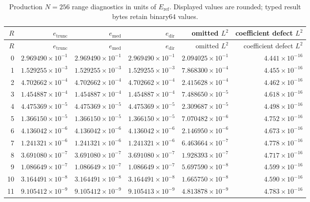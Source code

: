 \documentclass[11pt]{article}
\begin{document}
\begingroup
\small
\setlength{\tabcolsep}{4pt}
\begin{longtable}{r@{\quad}rrrrr}
\caption{Production $N=256$ range diagnostics in units of $E_{\mathrm{ref}}$.  Displayed values are rounded; typed result bytes retain binary64 values.}\\
\toprule
$R$ & $e_{\mathrm{trunc}}$ & $e_{\mathrm{med}}$ & $e_{\mathrm{dir}}$ & omitted $L^2$ & coefficient defect $L^2$ \\
\midrule
\endfirsthead
\toprule
$R$ & $e_{\mathrm{trunc}}$ & $e_{\mathrm{med}}$ & $e_{\mathrm{dir}}$ & omitted $L^2$ & coefficient defect $L^2$ \\
\midrule
\endhead
0  & $2.969490\times10^{-1}$ & $2.969490\times10^{-1}$ & $2.969490\times10^{-1}$ & $2.094025\times10^{-1}$ & $4.441\times10^{-16}$ \\
1  & $1.529255\times10^{-3}$ & $1.529255\times10^{-3}$ & $1.529255\times10^{-3}$ & $7.868300\times10^{-4}$ & $4.455\times10^{-16}$ \\
2  & $4.702662\times10^{-4}$ & $4.702662\times10^{-4}$ & $4.702662\times10^{-4}$ & $2.415628\times10^{-4}$ & $4.462\times10^{-16}$ \\
3  & $1.454887\times10^{-4}$ & $1.454887\times10^{-4}$ & $1.454887\times10^{-4}$ & $7.488650\times10^{-5}$ & $4.618\times10^{-16}$ \\
4  & $4.475369\times10^{-5}$ & $4.475369\times10^{-5}$ & $4.475369\times10^{-5}$ & $2.309687\times10^{-5}$ & $4.498\times10^{-16}$ \\
5  & $1.366150\times10^{-5}$ & $1.366150\times10^{-5}$ & $1.366150\times10^{-5}$ & $7.070482\times10^{-6}$ & $4.752\times10^{-16}$ \\
6  & $4.136042\times10^{-6}$ & $4.136042\times10^{-6}$ & $4.136042\times10^{-6}$ & $2.146950\times10^{-6}$ & $4.673\times10^{-16}$ \\
7  & $1.241321\times10^{-6}$ & $1.241321\times10^{-6}$ & $1.241321\times10^{-6}$ & $6.463664\times10^{-7}$ & $4.778\times10^{-16}$ \\
8  & $3.691080\times10^{-7}$ & $3.691080\times10^{-7}$ & $3.691080\times10^{-7}$ & $1.928393\times10^{-7}$ & $4.717\times10^{-16}$ \\
9  & $1.086649\times10^{-7}$ & $1.086649\times10^{-7}$ & $1.086649\times10^{-7}$ & $5.697590\times10^{-8}$ & $4.599\times10^{-16}$ \\
10 & $3.164491\times10^{-8}$ & $3.164491\times10^{-8}$ & $3.164491\times10^{-8}$ & $1.665750\times10^{-8}$ & $4.590\times10^{-16}$ \\
11 & $9.105412\times10^{-9}$ & $9.105412\times10^{-9}$ & $9.105413\times10^{-9}$ & $4.813878\times10^{-9}$ & $4.783\times10^{-16}$ \\

\end{longtable}
\end{document}
